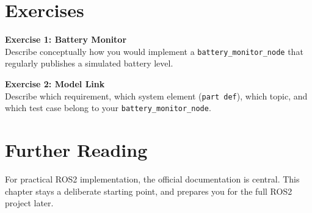 \section{Exercises}
\begin{uebungbox}
\textbf{Exercise 1: Battery Monitor}\\
Describe conceptually how you would implement a \texttt{battery\_monitor\_node} that regularly publishes a simulated battery level.
\end{uebungbox}

\begin{uebungbox}
\textbf{Exercise 2: Model Link}\\
Describe which requirement, which system element (\texttt{part def}), which topic, and which test case belong to your \texttt{battery\_monitor\_node}.
\end{uebungbox}

\section{Further Reading}
For practical ROS2 implementation, the official documentation \cite{ros2docs} is central. This chapter stays a deliberate starting point, and prepares you for the full ROS2 project later.
